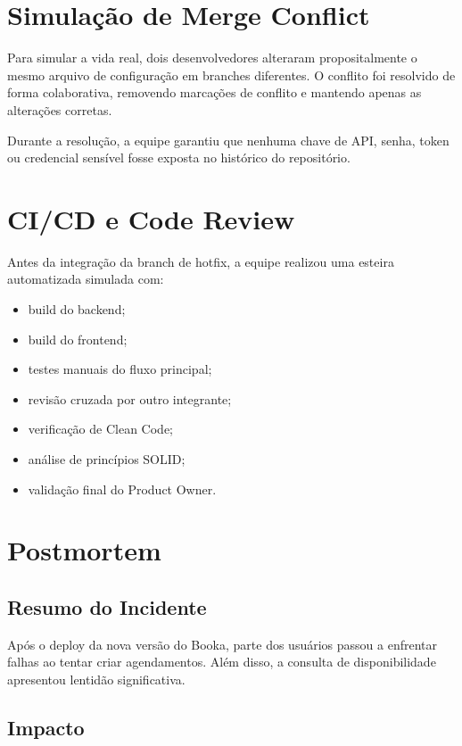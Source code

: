 \documentclass[12pt,a4paper]{article}
\begin{document}
\section{Simulação de Merge Conflict}

Para simular a vida real, dois desenvolvedores alteraram propositalmente o mesmo arquivo de configuração em branches diferentes. O conflito foi resolvido de forma colaborativa, removendo marcações de conflito e mantendo apenas as alterações corretas.

Durante a resolução, a equipe garantiu que nenhuma chave de API, senha, token ou credencial sensível fosse exposta no histórico do repositório.

\section{CI/CD e Code Review}

Antes da integração da branch de hotfix, a equipe realizou uma esteira automatizada simulada com:

\begin{itemize}
    \item build do backend;
    \item build do frontend;
    \item testes manuais do fluxo principal;
    \item revisão cruzada por outro integrante;
    \item verificação de Clean Code;
    \item análise de princípios SOLID;
    \item validação final do Product Owner.
\end{itemize}

\section{Postmortem}

\subsection*{Resumo do Incidente}

Após o deploy da nova versão do Booka, parte dos usuários passou a enfrentar falhas ao tentar criar agendamentos. Além disso, a consulta de disponibilidade apresentou lentidão significativa.

\subsection*{Impacto}
\end{document}
